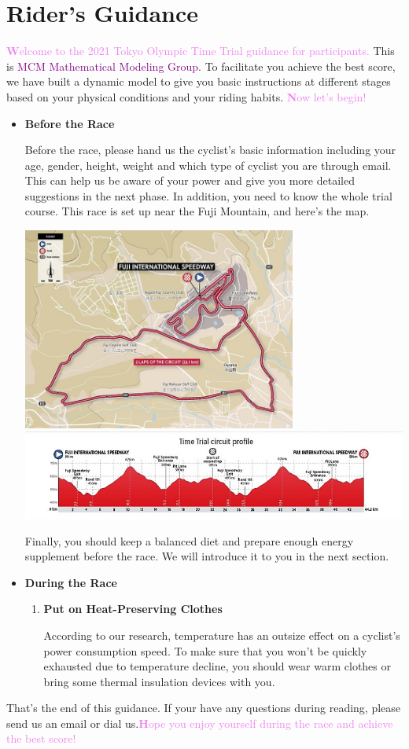 \documentclass{article}
\newcommand{\itembf}{\item \textbf}
\newcommand{\violetbf}[1]{\textcolor{violet}{\textbf #1}}
\begin{document}
	\section{Rider's Guidance}
	\violetbf{Welcome to the 2021 Tokyo Olympic Time Trial guidance for participants.} This is \textcolor{purple}{MCM Mathematical Modeling Group}. To facilitate you achieve the best score, we have built a dynamic model to give you basic instructions at different stages based on your physical conditions and your riding habits. \violetbf{Now let's begin!}
	\begin{itemize}
	\itembf {Before the Race}

			Before the race, please hand us the cyclist's basic information including your age, gender, height, weight and which type of cyclist you are through email. This can help us be aware of your power and give you more detailed suggestions in the next phase. In addition, you need to know the whole trial course. This race is set up near the Fuji Mountain, and here's the map.\cite{tokyo}

			\begin{center}
				\includegraphics[width=9cm]{1.jpg}\\
				\includegraphics[width=14cm]{3.jpg}
			\end{center}

			Finally, you should keep a balanced diet and prepare enough energy supplement before the race. We will introduce it to you in the next section.
	\itembf{During the Race}
	\begin{enumerate}
		\itembf{Put on Heat-Preserving Clothes}

			According to our research, temperature has an outsize effect on a cyclist's power consumption speed. To make sure that you won't be quickly exhausted due to temperature decline, you should wear warm clothes or bring some thermal insulation devices with you.
	\end{enumerate}
	\end{itemize}
	That's the end of this guidance. If your have any questions during reading, please send us an email or dial us.\violetbf{Hope you enjoy yourself during the race and achieve the best score!}
\end{document}
